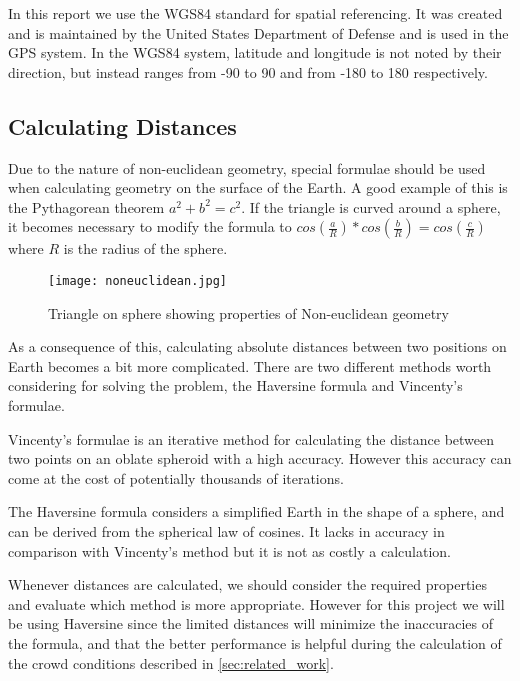 In this report we use the WGS84 standard for spatial referencing. It was created and is maintained by the United States Department of Defense \cite{WGS84} and is used in the GPS system. In the WGS84 system, latitude and longitude is not noted by their direction, but instead ranges from -90 to 90 and from -180 to 180 respectively.

\subsection{Calculating Distances}

Due to the nature of non-euclidean geometry, special formulae should be used when calculating geometry on the surface of the Earth. A good example of this is the Pythagorean theorem $a^2 + b^2 = c^2$. If the triangle is curved around a sphere, it becomes necessary to modify the formula to $cos(\frac{a}{R}) * cos(\frac{b}{R}) = cos(\frac{c}{R})$ where $R$ is the radius of the sphere\cite{website:lawofcosines}.

\begin{figure}
    \centering
\texttt{[image: noneuclidean.jpg]}
\caption{Triangle on sphere showing properties of Non-euclidean geometry \cite{earthtriangle}}
\label{noneuclidean}
\end{figure}

As a consequence of this, calculating absolute distances between two positions on Earth becomes a bit more complicated. There are two different methods worth considering for solving the problem, the Haversine formula and Vincenty's formulae.

Vincenty's formulae\cite{vincenty} is an iterative method for calculating the distance between two points on an oblate spheroid with a high accuracy. However this accuracy can come at the cost of potentially thousands of iterations.

The Haversine formula considers a simplified Earth in the shape of a sphere, and can be derived from the spherical law of cosines\cite{website:lawofcosines}. It lacks in accuracy in comparison with Vincenty's method but it is not as costly a calculation.

Whenever distances are calculated, we should consider the required properties and evaluate which method is more appropriate. However for this project we will be using Haversine since the limited distances will minimize the inaccuracies of the formula, and that the better performance is helpful during the calculation of the crowd conditions described in \cref{sec:related_work}.



